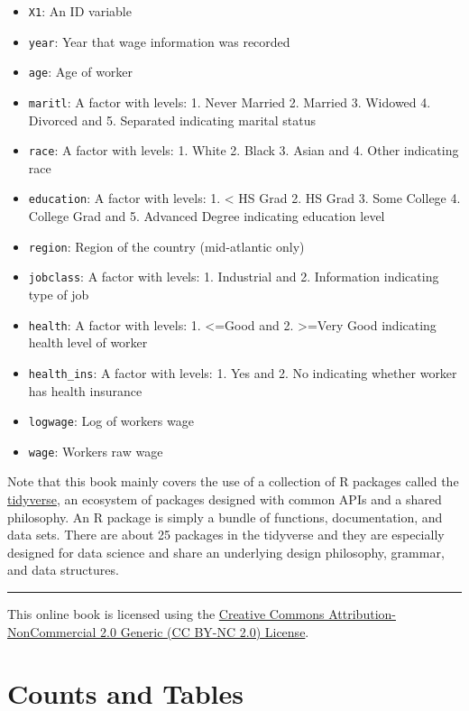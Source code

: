 \documentclass[
]{book}
\providecommand{\tightlist}{%
  \setlength{\itemsep}{0pt}\setlength{\parskip}{0pt}}
\begin{document}
\begin{itemize}
\tightlist
\item
  \texttt{X1}: An ID variable
\item
  \texttt{year}: Year that wage information was recorded
\item
  \texttt{age}: Age of worker
\item
  \texttt{maritl}: A factor with levels: 1. Never Married 2. Married 3. Widowed 4. Divorced and 5. Separated indicating marital status
\item
  \texttt{race}: A factor with levels: 1. White 2. Black 3. Asian and 4. Other indicating race
\item
  \texttt{education}: A factor with levels: 1. \textless{} HS Grad 2. HS Grad 3. Some College 4. College Grad and 5. Advanced Degree indicating education level
\item
  \texttt{region}: Region of the country (mid-atlantic only)
\item
  \texttt{jobclass}: A factor with levels: 1. Industrial and 2. Information indicating type of job
\item
  \texttt{health}: A factor with levels: 1. \textless=Good and 2. \textgreater=Very Good indicating health level of worker
\item
  \texttt{health\_ins}: A factor with levels: 1. Yes and 2. No indicating whether worker has health insurance
\item
  \texttt{logwage}: Log of workers wage
\item
  \texttt{wage}: Workers raw wage
\end{itemize}

Note that this book mainly covers the use of a collection of R packages called the \href{https://www.tidyverse.org}{tidyverse}, an ecosystem of packages designed with common APIs and a shared philosophy. An R package is simply a bundle of functions, documentation, and data sets. There are about 25 packages in the tidyverse and they are especially designed for data science and share an underlying design philosophy, grammar, and data structures.

\begin{center}\rule{0.5\linewidth}{0.5pt}\end{center}

This online book is licensed using the \href{https://creativecommons.org/licenses/by-nc/2.0/}{Creative Commons Attribution-NonCommercial 2.0 Generic (CC BY-NC 2.0) License}.

\hypertarget{tables}{%
\chapter{Counts and Tables}\label{tables}}
\end{document}
